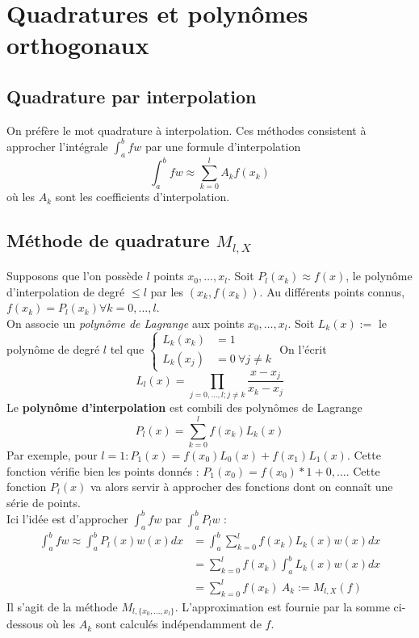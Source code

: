 \setcounter{section}{18}
\section{Quadratures et polynômes orthogonaux}
\setcounter{subsection}{6}
\subsection{Quadrature par interpolation}
On préfère le mot quadrature à interpolation. Ces méthodes consistent à 
approcher l'intégrale $\int_a^b fw$ par une formule d'interpolation
\begin{equation}
	\int_a^b fw \approx \sum_{k=0}^l A_k f(x_k)
\end{equation}
où les $A_k$ sont les coefficients d'interpolation.
\subsection{Méthode de quadrature $M_{l,X}$}
Supposons que l'on possède $l$ points $x_0,\dots, x_l$. Soit $P_l(x_k) \approx 
f(x)$, le polynôme d'interpolation de degré $\leq l$ par les $(x_k, f(x_k))$. 
Au différents points connus, $f(x_k) = P_l(x_k) \forall k =0,\dots,l$.\\
On associe un \textit{polynôme de Lagrange} aux points $x_0,\dots,x_l$. Soit 
$L_k(x) :=$ le polynôme de degré $l$ tel que $\left\{\begin{array}{ll}
L_k(x_k) &= 1\\
L_k(x_j) &= 0\ \forall j \neq k
\end{array}\right.$ On l'écrit 
\begin{equation}
	L_l(x) = \prod_{j=0,\dots,l;j\neq k} \frac{x-x_j}{x_k-x_j}
\end{equation}
Le \textbf{polynôme d'interpolation} est combili des polynômes de Lagrange 
\begin{equation}
	P_l(x) = \sum_{k=0}^l f(x_k)L_k(x)
\end{equation}
Par exemple, pour $l=1 : P_1(x) = f(x_0)L_0(x) + f(x_1)L_1(x)$. Cette fonction 
vérifie bien les points donnés : $P_1(x_0) = f(x_0)*1 + 0, \dots$. Cette fonction 
$P_l(x)$ va alors servir à approcher des fonctions dont on connaît une série 
de points.\\
Ici l'idée est d'approcher $\int_a^b fw$ par $\int_a^b P_lw$ :
\begin{equation}
	\begin{array}{ll}
		\int_a^b fw \approx \int_a^b P_l(x)w(x) dx & = \int_a^b \sum_{k=0}^l f(x_k)              
		L_k(x)w(x)dx\\
		                                           & = \sum_{k=0}^l f(x_k)\int_a^b L_k(x)w(x) dx \\
		                                           & = \sum_{k=0}^l f(x_k)\ A_k := M_{l,X}(f)    
	\end{array}
\end{equation}
Il s'agit de la méthode $M_{l,\{x_0,\dots,x_l\}}$. L'approximation est fournie 
par la somme ci-dessous où les $A_k$ sont calculés indépendamment de $f$.\\
	
